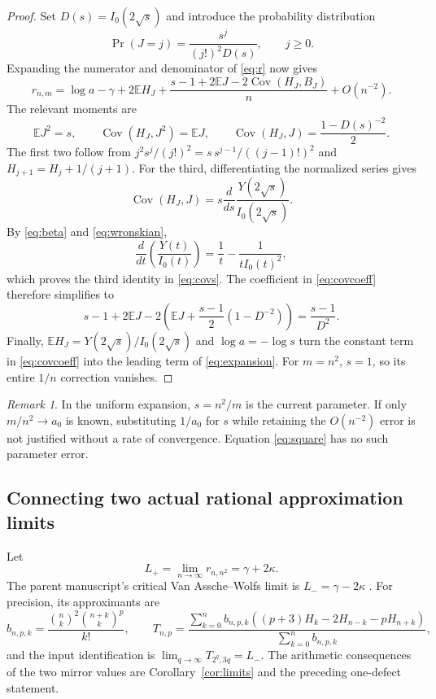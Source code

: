 \documentclass[11pt]{article}
\theoremstyle{definition}
\theoremstyle{remark}
\newtheorem{remark}[theorem]{Remark}
\newcommand{\Cov}{\operatorname{Cov}}
\newcommand{\Ex}{\mathbb E}
\begin{document}
\begin{proof}
Set $D(s)=I_0(2\sqrt s)$ and introduce the probability distribution
\[
\Pr(J=j)=\frac{s^j}{(j!)^2D(s)},\qquad j\ge0.
\]
Expanding the numerator and denominator of \eqref{eq:r} now gives
\begin{equation}\label{eq:covcoeff}
r_{n,m}=\log a-\gamma+2\Ex H_J
 +\frac{s-1+2\Ex J-2\Cov(H_J,B_J)}{n}+O(n^{-2}).
\end{equation}
The relevant moments are
\begin{equation}\label{eq:covs}
\Ex J^2=s,\qquad
\Cov(H_J,J^2)=\Ex J,\qquad
\Cov(H_J,J)=\frac{1-D(s)^{-2}}2.
\end{equation}
The first two follow from $j^2s^j/(j!)^2=s\,s^{j-1}/((j-1)!)^2$
and $H_{j+1}=H_j+1/(j+1)$. For the third, differentiating the
normalized series gives
\[
\Cov(H_J,J)=s\frac{d}{ds}\frac{Y(2\sqrt s)}{I_0(2\sqrt s)}.
\]
By \eqref{eq:beta} and \eqref{eq:wronskian},
\[
\frac{d}{dt}\left(\frac{Y(t)}{I_0(t)}\right)
=\frac1t-\frac{1}{tI_0(t)^2},
\]
which proves the third identity in \eqref{eq:covs}.
The coefficient in \eqref{eq:covcoeff} therefore simplifies to
\[
s-1+2\Ex J
-2\left(\Ex J+\frac{s-1}{2}(1-D^{-2})\right)
=\frac{s-1}{D^2}.
\]
Finally,
$\Ex H_J=Y(2\sqrt s)/I_0(2\sqrt s)$ and
$\log a=-\log s$ turn the constant term in \eqref{eq:covcoeff}
into the leading term of \eqref{eq:expansion}. For $m=n^2$,
$s=1$, so its entire $1/n$ correction vanishes.
\end{proof}

\begin{remark}
In the uniform expansion, $s=n^2/m$ is the current parameter. If only
$m/n^2\to a_0$ is known, substituting $1/a_0$ for $s$ while retaining
the $O(n^{-2})$ error is not justified without a rate of convergence.
Equation \eqref{eq:square} has no such parameter error.
\end{remark}

\subsection{Connecting two actual rational approximation limits}
Let
\[
L_+=\lim_{n\to\infty}r_{n,n^2}=\gamma+2\kappa.
\]
The parent manuscript's critical Van Assche--Wolfs limit is
$L_-=\gamma-2\kappa$ \cite[Section 3.5]{Intersection}. For precision, its
approximants are
\[
b_{n,p,k}=\frac{\binom nk^2\binom{n+k}{k}^{p}}{k!},\qquad
T_{n,p}=\frac{\sum_{k=0}^n b_{n,p,k}
 ((p+3)H_k-2H_{n-k}-pH_{n+k})}{\sum_{k=0}^n b_{n,p,k}},
\]
and the input identification is $\lim_{q\to\infty}T_{2^q,3q}=L_-$.
The arithmetic consequences of the two mirror values are
Corollary~\ref{cor:limits} and the preceding one-defect statement.
\end{document}
